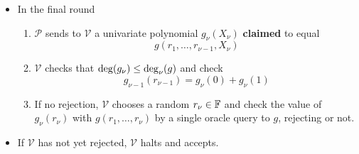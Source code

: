 \documentclass{article}
\begin{document}
\begin{boxx1}
\begin{itemize}
\begin{enumerate}
\begin{equation} \label{eq:key-step-sum-check}
g_{j-1}(r_{j-1}) = g_j(0) + g_j(1)
\end{equation}
\item\label{item:8} If no rejection, $\mathcal{V}$ chooses a random element $r_j \in \F$ and sends to $\mathcal{P}$.
\end{enumerate}
\item In the final round 
\begin{enumerate}
\item\label{item:9} $\mathcal{P}$ sends to $\mathcal{V}$ a univariate polynomial $g_{\nu}(X_{\nu})$ \textbf{claimed} to equal
\begin{equation*}
g(r_1, \dots, r_{\nu - 1}, X_{\nu})
\end{equation*}
\item\label{item:14} $\mathcal{V}$ checks that $\operatorname{deg}(g_{\nu}) \leq \operatorname{deg}_{\nu}(g)$ and check 
\begin{equation*}
g_{\nu - 1} (r_{\nu -1}) = g_{\nu} (0) + g_{\nu} (1)
\end{equation*}
\item\label{item:10} If no rejection, $\mathcal{V}$ chooses a random $r_{\nu} \in \mathbb{F}$ and check the value of $g_{\nu}(r_{\nu})$ with  $g(r_1, \dots, r_{\nu})$ by a single oracle query to $g$, rejecting or not. 
 
\end{enumerate}
\item  If $\mathcal{V}$ has not yet rejected, $\mathcal{V}$ halts and accepts.
\end{itemize}

\end{boxx1}
\end{document}
